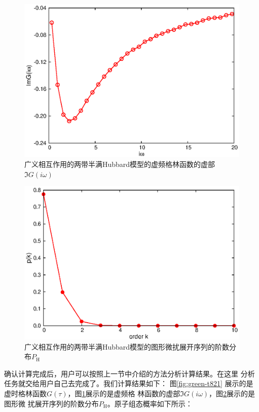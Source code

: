 \begin{figure}
\centering
\includegraphics{figure/grn-t821.eps}
\caption{广义相互作用的两带半满Hubbard模型的虚频格林函数的虚部$\Im G(i\omega)$} 
\label{fig:grn-t821}
\end{figure}

\begin{figure}
\centering
\includegraphics{figure/hist-t821.eps}
\caption{广义相互作用的两带半满Hubbard模型的图形微扰展开序列的阶数分布$P_{\text{H}}$} 
\label{fig:hist-t821}
\end{figure}

确认计算完成后，用户可以按照上一节中介绍的方法分析计算结果。在这里
分析任务就交给用户自己去完成了。我们计算结果如下： 图\ref{fig:green-t821}
展示的是虚时格林函数$G(\tau)$，图\ref{fig:grn-t821}展示的是虚频格
林函数的虚部$\Im G(i\omega)$，图\ref{fig:hist-t821}展示的是图形微
扰展开序列的阶数分布$P_{\text{H}}$。原子组态概率如下所示：

